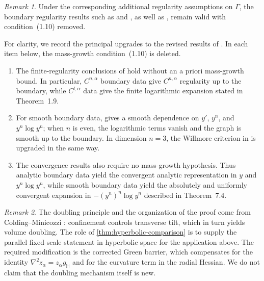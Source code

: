 \documentclass[11pt,reqno]{amsart}
\numberwithin{equation}{section}
\theoremstyle{definition}
\theoremstyle{remark}
\newtheorem{remark}[remark]{Remark}
\newcommand{\Hyp}{\mathbb H}
\begin{document}
\begin{remark}
   Under the
corresponding additional regularity assumptions on $\Gamma$, the boundary regularity results such as
\cite[Theorems~1.6, 1.7, 1.9, and~1.10]{JiangXie} and
\cite[Corollary~1.8]{JiangXie}, as well as \cite[Theorem~7.4]{JiangXie}, 
remain valid with condition~(1.10) removed.  
\end{remark}
For clarity, we record the principal upgrades to the revised results of
\cite{JiangXie}.  In each item below, the mass-growth condition~(1.10) is
deleted.
\begin{enumerate}
 \item The finite-regularity conclusions of
 \cite[Theorems~1.6 and~1.9]{JiangXie} hold without an a priori mass-growth
 bound.  In particular, $C^{n,\alpha}$ boundary data give $C^{n,\alpha}$
 regularity up to the boundary, while $C^{l,\alpha}$ data give the finite
 logarithmic expansion stated in Theorem~1.9.

 \item For smooth boundary data, \cite[Theorem~1.7]{JiangXie} gives a smooth
 dependence on $y'$, $y^n$, and $y^n\log y^n$; when $n$ is even, the logarithmic
 terms vanish and the graph is smooth up to the boundary.  In dimension
 $n=3$, the Willmore criterion in \cite[Corollary~1.8]{JiangXie} is upgraded
 in the same way.

 \item The convergence results \cite[Theorems~1.10 and~7.4]{JiangXie} also
 require no mass-growth hypothesis.  Thus analytic boundary data yield the
 convergent analytic representation in $y$ and $y^n\log y^n$, while smooth
 boundary data yield the absolutely and uniformly convergent expansion in
 $-(y^n)^n\log y^n$ described in Theorem~7.4.
\end{enumerate}




\begin{remark}
\label{rem:CM}
The doubling principle and the organization of the proof come from
Colding--Minicozzi \cite{ColdingMinicozzi}: confinement controls transverse
tilt, which in turn yields volume doubling.  The role of
\cref{thm:hyperbolic-comparison} is to supply the parallel fixed-scale statement in
hyperbolic space for the application above.  The required modification is
the corrected Green barrier, which compensates for the identity
$\nabla^2z_\alpha=z_\alpha g_{\Hyp}$ and for the curvature term in the radial
Hessian.  We do not claim that the doubling mechanism itself is new.
\end{remark}
\end{document}
